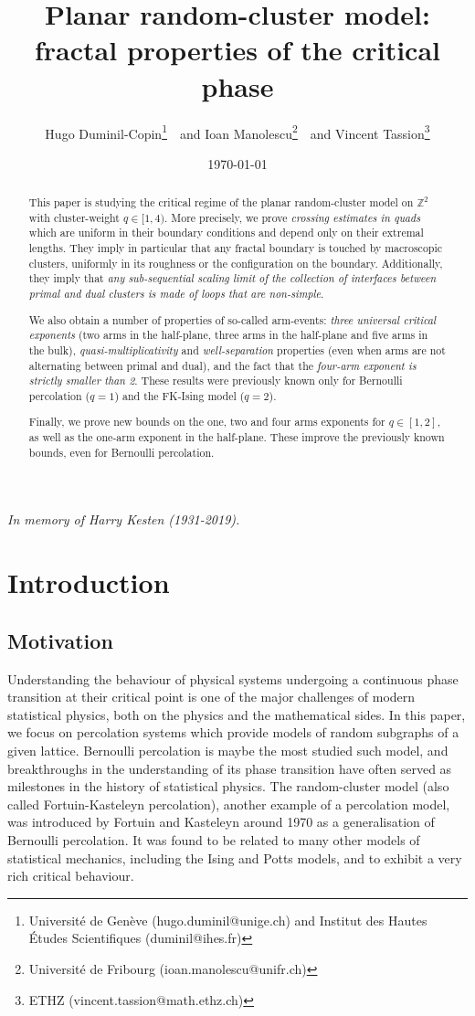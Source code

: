 \documentclass[a4paper,oneside,11pt]{article}
\title{Planar random-cluster model: fractal properties of the critical phase}
\author{Hugo Duminil-Copin\footnote{Universit\'e de Gen\`eve (hugo.duminil@unige.ch) and Institut des Hautes \'Etudes Scientifiques (duminil@ihes.fr)}\ \ and Ioan Manolescu\footnote{Universit\'e de Fribourg (ioan.manolescu@unifr.ch)}\ \ and Vincent Tassion\footnote{ETHZ (vincent.tassion@math.ethz.ch)}}
\date{\today}
\numberwithin{equation}{section}
\numberwithin{equation}{section}
\numberwithin{equation}{section}
\begin{document}
\maketitle

\begin{center}
{\em In memory of Harry Kesten (1931-2019).}
\bigbreak
\end{center}
\begin{abstract}
  This paper is studying the critical regime of the planar random-cluster model on $\mathbb Z^2$ with cluster-weight $q\in[1,4)$. More precisely, we prove {\em crossing estimates in quads} which are uniform in their boundary conditions and depend only on their extremal lengths. They imply in particular that any fractal boundary is touched by macroscopic clusters, uniformly in its roughness or the configuration on the boundary. Additionally, they imply that {\em any sub-sequential scaling limit of the collection of interfaces between primal and dual clusters is made of loops that are non-simple}.

We also obtain a number of properties of so-called arm-events: 
{\em three universal critical exponents} (two arms in the half-plane, three arms in the half-plane and five arms in the bulk), 
{\em quasi-multiplicativity} and {\em well-separation} properties (even when arms are not alternating between primal and dual), and the fact that the {\em four-arm exponent is strictly smaller than 2}. These results were previously known only for Bernoulli percolation ($q = 1$)
and the FK-Ising model ($q = 2$). 

Finally, we prove new bounds on the one, two and four arms exponents for $q\in[1,2]$, as well as the one-arm exponent in the half-plane. These improve the previously known bounds, even for Bernoulli percolation.
\end{abstract}


\section{Introduction}
 
\subsection{Motivation}

Understanding the behaviour of physical systems undergoing a continuous phase transition at their critical point is one of the major challenges of modern statistical physics, both on the physics and the mathematical sides. In this paper, we focus on percolation systems which provide models of random subgraphs of a given lattice. Bernoulli percolation is maybe the most studied such model, and breakthroughs in the understanding of its phase transition have often served as milestones in the  history of statistical physics.  The random-cluster model (also called Fortuin-Kasteleyn percolation), another example of a percolation model, was introduced by Fortuin and Kasteleyn around 1970 \cite{For70,ForKas72} as a generalisation of Bernoulli percolation. 
It was found to be related to many other models of statistical mechanics, including the Ising and Potts models, and to exhibit a very rich critical behaviour. 
\end{document}
